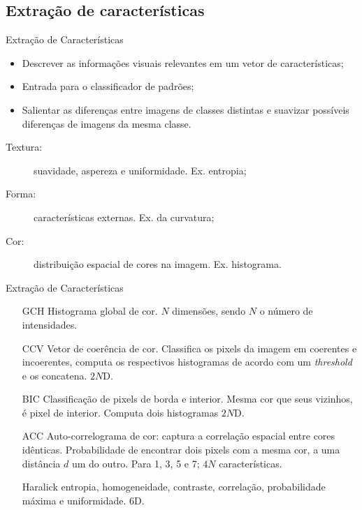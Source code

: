 \documentclass{beamer}
\begin{document}
\subsection{Extração de características}
\begin{frame}{Extração de Características}
\begin{itemize}
\item Descrever as informações visuais relevantes em um vetor de características;
\item Entrada para o classificador de padrões;
\item Salientar as diferenças entre imagens de classes distintas e suavizar possíveis diferenças de imagens da mesma classe.
\end{itemize}
\begin{description}%
\item [Textura:] suavidade, aspereza e uniformidade. Ex. entropia;
\item [Forma:] características externas. Ex. da curvatura;
\item [Cor:] distribuição espacial de cores na imagem. Ex. histograma.
\end{description}
\end{frame}
\begin{frame}{Extração de Características}
\begin{itemize}
\item[GCH] Histograma global de cor. $N$ dimensões, sendo $N$ o número de intensidades. %

\item[CCV] Vetor de coerência de cor. Classifica os pixels da imagem em coerentes e incoerentes, computa os respectivos histogramas de acordo com um \textit{threshold} e os concatena. $2N$D. %

\item[BIC] Classificação de pixels de borda e interior. Mesma cor que seus vizinhos, é pixel de interior. Computa dois histogramas $2N$D.

\item[ACC] Auto-correlograma de cor: captura a correlação espacial entre cores idênticas. Probabilidade de encontrar dois pixels com a mesma cor, a uma distância $d$ um do outro. Para 1, 3, 5 e 7; $4N$ características.

\item[Haralick] entropia, homogeneidade, contraste, correlação, probabilidade máxima e uniformidade. 6D.
\end{itemize}
\end{frame}
\end{document}
